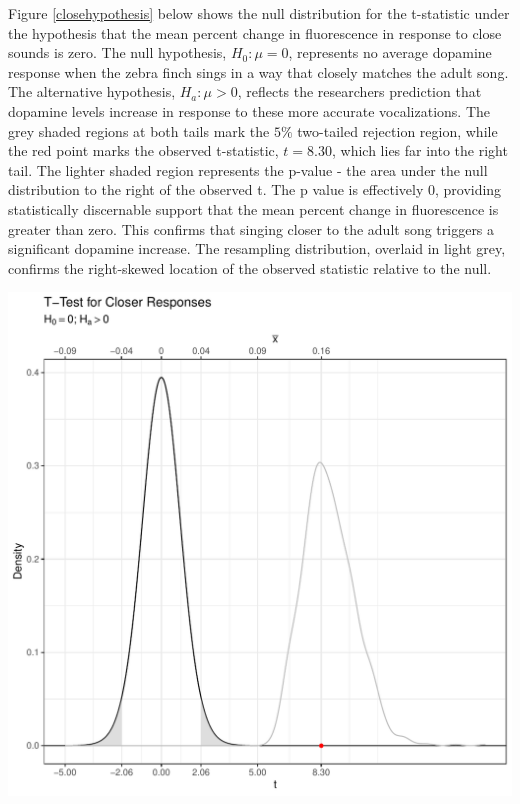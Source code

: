 \documentclass{article}\usepackage[]{graphicx}\usepackage[]{xcolor}
\makeatletter
\def\maxwidth{ %
  \ifdim\Gin@nat@width>\linewidth
    \linewidth
  \else
    \Gin@nat@width
  \fi
}
\newenvironment{knitrout}{}{} %
\makeatother
\begin{document}
\begin{enumerate}
\begin{enumerate}
Figure \ref{closehypothesis} below shows the null distribution for the t-statistic
under the hypothesis that the mean percent change in fluorescence in response to
close sounds is zero. The null hypothesis, $H_0: \mu = 0$, represents no average
dopamine response when the zebra finch sings in a way that closely matches the
adult song. The alternative hypothesis, $H_a: \mu > 0$, reflects the researchers
prediction that dopamine levels increase in response to these more accurate vocalizations.
The grey shaded regions at both tails mark the $5\%$ two-tailed rejection region, while
the red point marks the observed t-statistic, $t=8.30$, which lies far into the 
right tail. The lighter shaded region represents the p-value - the area under the
null distribution to the right of the observed t. The p value is effectively 0, providing
statistically discernable support that the mean percent change in fluorescence is greater
than zero. This confirms that singing closer to the adult song triggers a significant
dopamine increase. The resampling distribution, overlaid in light grey, confirms the
right-skewed location of the observed statistic relative to the null.

\begin{knitrout}\scriptsize
{}\color{fgcolor}
\includegraphics[width=\maxwidth]{figure/plot2-1} 
\end{knitrout}


\end{enumerate}
\end{enumerate}
\end{document}
